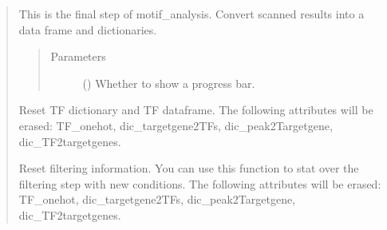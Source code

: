 \documentclass[letterpaper,10pt,english]{sphinxmanual}
\begin{document}
\begin{quote}
\begin{fulllineitems}
\begin{fulllineitems}
\label{\detokenize{modules/celloracle.motif_analysis:celloracle.motif_analysis.TFinfo.make_TFinfo_dataframe_and_dictionary}}
This is the final step of motif\_analysis.
Convert scanned results into a data frame and dictionaries.
\begin{quote}\begin{description}
\item[{Parameters}] \leavevmode
{} () \textendash{} Whether to show a progress bar.

\end{description}\end{quote}

\end{fulllineitems}


\begin{fulllineitems}
\label{\detokenize{modules/celloracle.motif_analysis:celloracle.motif_analysis.TFinfo.reset_dictionary_and_df}}
Reset TF dictionary and TF dataframe.
The following attributes will be erased: TF\_onehot, dic\_targetgene2TFs, dic\_peak2Targetgene, dic\_TF2targetgenes.

\end{fulllineitems}


\begin{fulllineitems}
\label{\detokenize{modules/celloracle.motif_analysis:celloracle.motif_analysis.TFinfo.reset_filtering}}
Reset filtering information.
You can use this function to stat over the filtering step with new conditions.
The following attributes will be erased: TF\_onehot, dic\_targetgene2TFs, dic\_peak2Targetgene, dic\_TF2targetgenes.

\end{fulllineitems}


\end{fulllineitems}
\end{quote}
\end{document}
